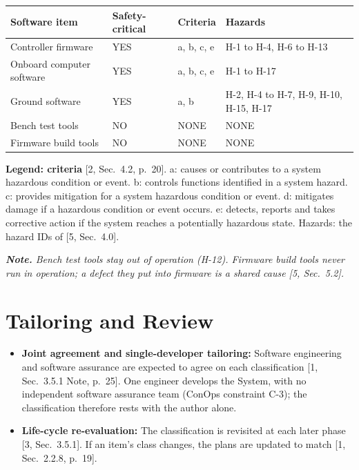 \documentclass[11pt,a4paper]{article}
\begin{document}
\begin{table}[H]
\centering
\begin{tabularx}{\textwidth}{@{}lll>{\raggedright\arraybackslash}X@{}}
\toprule
Software item & Safety-critical & Criteria & Hazards \\
\midrule
Controller firmware & YES & a, b, c, e & H-1 to H-4, H-6 to H-13 \\
Onboard computer software & YES & a, b, c, e & H-1 to H-17 \\
Ground software & YES & a, b & H-2, H-4 to H-7, H-9, H-10, H-15, H-17 \\
Bench test tools & NO & NONE & NONE \\
Firmware build tools & NO & NONE & NONE \\
\bottomrule
\end{tabularx}
\end{table}

\noindent\textbf{Legend: criteria} [2, Sec.~4.2, p.~20]. a: causes or
contributes to a system hazardous condition or event. b: controls functions
identified in a system hazard. c: provides mitigation for a system hazardous
condition or event. d: mitigates damage if a hazardous condition or event
occurs. e: detects, reports and takes corrective action if the system reaches
a potentially hazardous state. Hazards: the hazard IDs of [5, Sec.~4.0].

\medskip
{\itshape \noindent\textbf{Note.} Bench test tools stay out of operation
(H-12). Firmware build tools never run in operation; a defect they put into
firmware is a shared cause [5, Sec.~5.2].\par}

\section{Tailoring and Review}
\begin{itemize}
\item \textbf{Joint agreement and single-developer tailoring:} Software
  engineering and software assurance are expected to agree on each
  classification [1, Sec.~3.5.1 Note, p.~25]. One engineer develops the System,
  with no independent software assurance team (ConOps constraint C-3); the
  classification therefore rests with the author alone.
\item \textbf{Life-cycle re-evaluation:} The classification is revisited at
  each later phase [3, Sec.~3.5.1]. If an item's class changes, the plans are
  updated to match [1, Sec.~2.2.8, p.~19].
\end{itemize}
\end{document}
